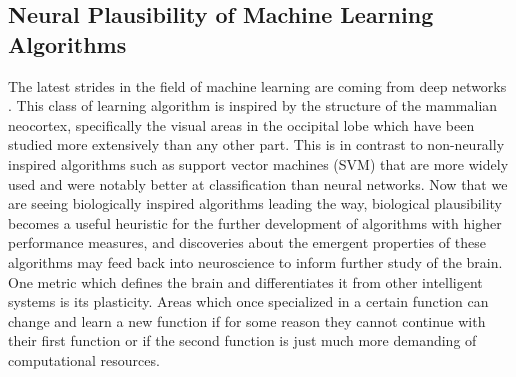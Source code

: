 \documentclass[12pt]{article}
\begin{document}
\begin{doublespacing}
	\subsection{Neural Plausibility of Machine Learning Algorithms}
		The latest strides in the field of machine learning are coming from deep networks \cite{bengio2009learning, grubb2010boosted, hinton2012deep, lee2009convolutional, krizhevsky2012imagenet, tang2012deep}. This class of learning algorithm is inspired by the structure of the mammalian neocortex, specifically the visual areas in the occipital lobe which have been studied more extensively than any other part. This is in contrast to non-neurally inspired algorithms such as support vector machines  (SVM) that are more widely used and were notably better at classification than neural networks\cite{byvatov2003comparison, ding2001multi, mukkamala2002intrusion, }. Now that we are seeing biologically inspired algorithms leading the way, biological plausibility becomes a useful heuristic for the further development of algorithms with higher performance measures, and discoveries about the emergent properties of these algorithms may feed back into neuroscience to inform further study of the brain. 
		One metric which defines the brain and differentiates it from other intelligent systems is its plasticity. Areas which once specialized in a certain function can change and learn a new function if for some reason they cannot continue with their first function or if the second function is just much more demanding of computational resources. \cite{sharma2000induction}
		

\end{doublespacing}
\end{document}
